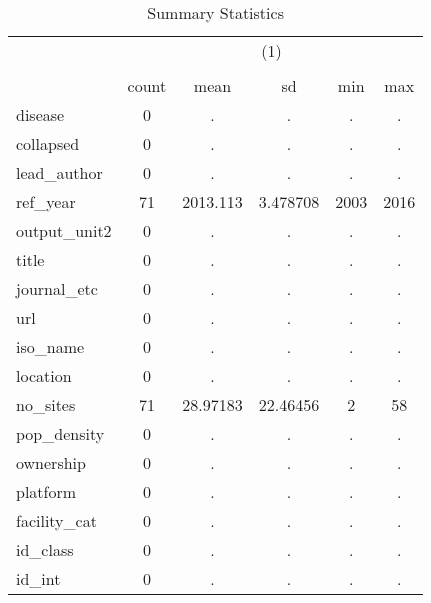 \begin{table}[htbp]\centering
\def\sym#1{\ifmmode^{#1}\else\(^{#1}\)\fi}
\caption{Summary Statistics}
\begin{tabular}{l*{1}{ccccc}}
\hline\hline
            &\multicolumn{5}{c}{(1)}                                         \\
            &\multicolumn{5}{c}{}                                            \\
            &       count&        mean&          sd&         min&         max\\
\hline
disease     &           0&           .&           .&           .&           .\\
collapsed   &           0&           .&           .&           .&           .\\
lead\_author &           0&           .&           .&           .&           .\\
ref\_year    &          71&    2013.113&    3.478708&        2003&        2016\\
output\_unit2&           0&           .&           .&           .&           .\\
title       &           0&           .&           .&           .&           .\\
journal\_etc &           0&           .&           .&           .&           .\\
url         &           0&           .&           .&           .&           .\\
iso\_name    &           0&           .&           .&           .&           .\\
location    &           0&           .&           .&           .&           .\\
no\_sites    &          71&    28.97183&    22.46456&           2&          58\\
pop\_density &           0&           .&           .&           .&           .\\
ownership   &           0&           .&           .&           .&           .\\
platform    &           0&           .&           .&           .&           .\\
facility\_cat&           0&           .&           .&           .&           .\\
id\_class    &           0&           .&           .&           .&           .\\
id\_int      &           0&           .&           .&           .&           .\\

\end{tabular}
\end{table}
